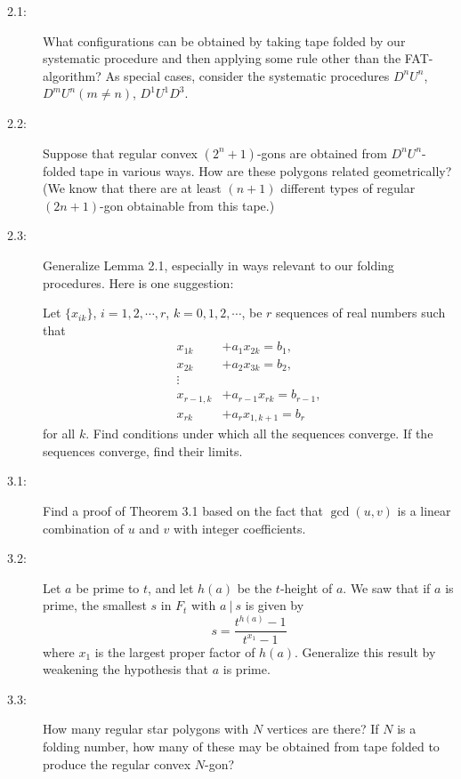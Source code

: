 \begin{description}

  \item[2.1:] What configurations can be obtained by taking tape folded by our systematic procedure and then applying some rule other than the FAT-algorithm? As special cases, consider the systematic procedures $D^{n} U^{n}$, $D^{m} U^{n} (m \neq n)$, $D^{1} U^{1} D^{3}$.

  \item[2.2:] Suppose that regular convex $(2^{n}+1)$-gons are obtained from $D^{n} U^{n}$-folded tape in various ways. How are these polygons related geometrically? (We know that there are at least $(n+1)$ different types of regular $(2n+1)$-gon obtainable from this tape.)

  \item[2.3:] Generalize Lemma 2.1, especially in ways relevant to our folding procedures. Here is one suggestion:

    Let $\{ x_{ik} \}$, $i = 1,2,\cdots,r$, $k = 0,1,2,\cdots$, be $r$ sequences of real numbers such that
    \begin{align*}
    x_{1k} & + a_{1} x_{2k} = b_{1}, \\
    x_{2k} & + a_{2} x_{3k} = b_{2}, \\
    \vdots & \\
    x_{r-1,k} & + a_{r-1} x_{rk} = b_{r-1}, \\
    x_{rk} & + a_{r} x_{1,k+1} = b_{r}
    \end{align*}
    for all $k$. Find conditions under which all the sequences converge. If the sequences converge, find their limits.

  \item[3.1:] Find a proof of Theorem 3.1 based on the fact that $\gcd(u,v)$ is a linear combination of $u$ and $v$ with integer coefficients.

  \item[3.2:] Let $a$ be prime to $t$, and let $h(a)$ be the $t$-height of $a$. We saw that if $a$ is prime, the smallest $s$ in $F_{t}$ with $a\ |\ s$ is given by
    \begin{equation*}
    s = \frac{t^{h(a)}-1}{t^{x_{1}}-1}
    \end{equation*}
    where $x_{1}$ is the largest proper factor of $h(a)$. Generalize this result by weakening the hypothesis that $a$ is prime.

  \item[3.3:] How many regular star polygons with $N$ vertices are there? If $N$ is a folding number, how many of these may be obtained from tape folded to produce the regular convex $N$-gon?


\end{description}
